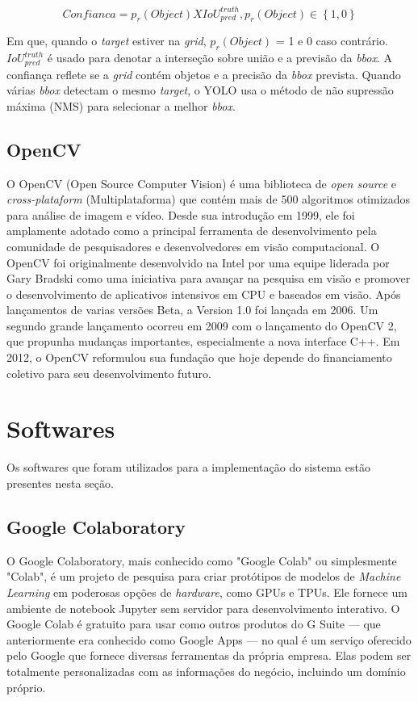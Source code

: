 \[Confianca = p_r(Object) X IoU_{pred}^{truth} , p_r(Object) \in \left \{ 1\right.,\left.0\right \}\]

Em que, quando o \textit{target} estiver na \textit{grid}, \(p_r(Object)\) = 1 e 0 caso contrário. \(IoU_{pred}^{truth}\) é usado para denotar a interseção sobre união e a previsão da \textit{bbox}. A confiança reflete se a \textit{grid} contém objetos e a precisão da \textit{bbox} prevista. Quando várias \textit{bbox} detectam o mesmo \textit{target}, o YOLO usa o método de não supressão máxima (NMS) para selecionar a melhor \textit{bbox}.

\subsection{OpenCV}

O OpenCV (Open Source Computer Vision) é uma biblioteca de \textit{open source} e \textit{cross-plataform} (Multiplataforma) que contém mais de 500 algoritmos otimizados para análise de imagem e vídeo. Desde sua introdução em 1999, ele foi amplamente adotado como a principal ferramenta de desenvolvimento pela comunidade de pesquisadores e desenvolvedores em visão computacional. O OpenCV foi originalmente desenvolvido na Intel por uma equipe liderada por Gary Bradski como uma iniciativa para avançar na pesquisa em visão e promover o desenvolvimento de aplicativos intensivos em CPU e baseados em visão. Após lançamentos de varias versões Beta,  a Version 1.0 foi lançada em 2006. Um segundo grande lançamento ocorreu em 2009 com o lançamento do OpenCV 2, que propunha mudanças importantes, especialmente a nova interface C++. Em 2012, o OpenCV reformulou sua fundação que hoje depende do financiamento coletivo para seu desenvolvimento futuro. \cite{opencv}

\section{Softwares}
Os softwares que foram utilizados para a implementação do sistema estão presentes nesta seção.
\subsection{Google Colaboratory}
O Google Colaboratory, mais conhecido como "Google Colab" ou simplesmente "Colab", é um projeto de pesquisa para criar protótipos de modelos de \textit{Machine Learning} em poderosas opções de \textit{hardware}, como GPUs e TPUs. Ele fornece um ambiente de notebook Jupyter sem servidor para desenvolvimento interativo. O Google Colab é gratuito para usar como outros produtos do G Suite — que anteriormente era conhecido como Google Apps — no qual é um serviço oferecido pelo Google que fornece diversas ferramentas da própria empresa. Elas podem ser totalmente personalizadas com as informações do negócio, incluindo um domínio próprio.

